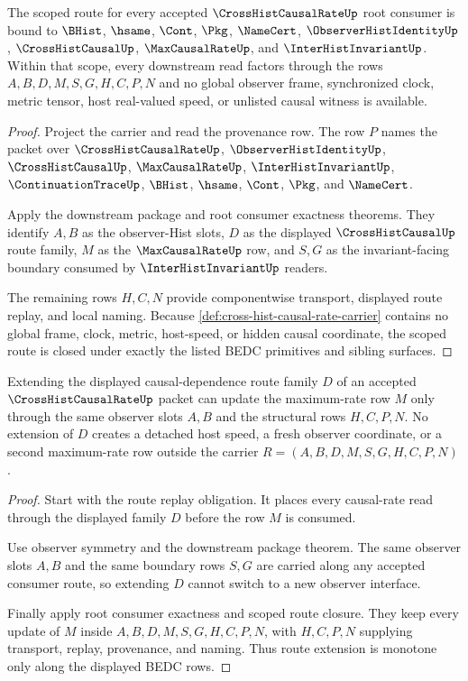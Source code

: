 \begin{theorem}
\label{thm:cross-hist-causal-rate-scoped-route-closure}
The scoped route for every accepted $\CrossHistCausalRateUp$ root consumer is bound to $\BHist$, $\hsame$, $\Cont$, $\Pkg$, $\NameCert$, $\ObserverHistIdentityUp$, $\CrossHistCausalUp$, $\MaxCausalRateUp$, and $\InterHistInvariantUp$. Within that scope, every downstream read factors through the rows $A,B,D,M,S,G,H,C,P,N$ and no global observer frame, synchronized clock, metric tensor, host real-valued speed, or unlisted causal witness is available.
\end{theorem}
\begin{proof}
Project the carrier and read the provenance row. The row $P$ names the packet over $\CrossHistCausalRateUp$, $\ObserverHistIdentityUp$, $\CrossHistCausalUp$, $\MaxCausalRateUp$, $\InterHistInvariantUp$, $\ContinuationTraceUp$, $\BHist$, $\hsame$, $\Cont$, $\Pkg$, and $\NameCert$.

Apply the downstream package and root consumer exactness theorems. They identify $A,B$ as the observer-Hist slots, $D$ as the displayed $\CrossHistCausalUp$ route family, $M$ as the $\MaxCausalRateUp$ row, and $S,G$ as the invariant-facing boundary consumed by $\InterHistInvariantUp$ readers.

The remaining rows $H,C,N$ provide componentwise transport, displayed route replay, and local naming. Because \autoref{def:cross-hist-causal-rate-carrier} contains no global frame, clock, metric, host-speed, or hidden causal coordinate, the scoped route is closed under exactly the listed BEDC primitives and sibling surfaces.
\end{proof}

\begin{theorem}
\label{thm:cross-hist-causal-rate-route-bound-monotonicity}
Extending the displayed causal-dependence route family $D$ of an accepted $\CrossHistCausalRateUp$ packet can update the maximum-rate row $M$ only through the same observer slots $A,B$ and the structural rows $H,C,P,N$. No extension of $D$ creates a detached host speed, a fresh observer coordinate, or a second maximum-rate row outside the carrier $R=(A,B,D,M,S,G,H,C,P,N)$.
\end{theorem}
\begin{proof}
Start with the route replay obligation. It places every causal-rate read through the displayed family $D$ before the row $M$ is consumed.

Use observer symmetry and the downstream package theorem. The same observer slots $A,B$ and the same boundary rows $S,G$ are carried along any accepted consumer route, so extending $D$ cannot switch to a new observer interface.

Finally apply root consumer exactness and scoped route closure. They keep every update of $M$ inside $A,B,D,M,S,G,H,C,P,N$, with $H,C,P,N$ supplying transport, replay, provenance, and naming. Thus route extension is monotone only along the displayed BEDC rows.
\end{proof}

